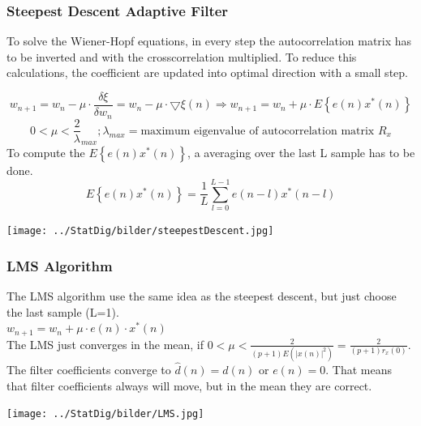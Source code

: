 \subsubsection{Steepest Descent Adaptive Filter }
To solve the Wiener-Hopf equations, in every step the autocorrelation matrix has to be inverted and with the crosscorrelation multiplied. 
To reduce this calculations, the coefficient are updated into optimal direction with a small step.
\begin{minipage}{13cm}
$$w_{n+1}=w_n-\mu \cdot  \dfrac{\delta \xi}{\delta w_n} =w_n-\mu \cdot \bigtriangledown\xi(n) \Rightarrow \boxed{ w_{n+1}= w_n+\mu \cdot E\left\lbrace e(n)x^*(n)\right\rbrace}$$
$$ 0<\mu< \frac 2 \lambda_{max}; \lambda_{max} = \text{maximum eigenvalue of autocorrelation matrix } R_x$$
To compute the $E\left\lbrace e(n)x^*(n)\right\rbrace$, a averaging over the last L sample has to be done.  
$$E\left\lbrace e(n)x^*(n)\right\rbrace= \frac{1}{L}\sum\limits_{l=0}^{L-1}e(n-l)x^*(n-l)$$
\end{minipage}
\begin{minipage}{6cm}
        \texttt{[image: ../StatDig/bilder/steepestDescent.jpg]}
\end{minipage}

\clearpage
\subsubsection{LMS Algorithm }
\begin{minipage}{14cm}

  The LMS algorithm use the same idea as the steepest descent, but just choose the last sample (L=1).\\
  $\boxed{ w_{n+1}=w_n+\mu \cdot e(n) \cdot x^*(n) }$\\
  
  The LMS just converges in the mean, if $0<\mu< \frac{2}{(p+1)E\left(|x(n)|^2\right)}=\frac{2}{(p+1)r_x(0)}$.
  The filter coefficients converge to $\hat d(n) = d(n)$ or $e(n) = 0$. 
  That means that filter coefficients always will move, but in the mean they are correct.
\end{minipage}
\begin{minipage}{5cm}
  \texttt{[image: ../StatDig/bilder/LMS.jpg]}
\end{minipage}

